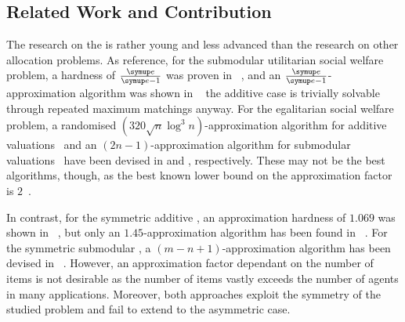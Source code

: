 \subsection{Related Work and Contribution}
\label{subsec:intro:contribution}

The research on the \NSW{} is rather young and less advanced than the research on other allocation problems.
As reference\footnotemark[1], for the submodular utilitarian social welfare problem, a hardness of \(\frac{\euler}{\euler - 1}\) was proven in \citeyear{inapprox_results_for_combi_auctions_with_submod_utility_funcs}~\cite{inapprox_results_for_combi_auctions_with_submod_utility_funcs}, and an \(\frac{\euler}{\euler - 1}\)-approximation algorithm was shown in \citeyear{opt_approx_for_the_submod_nsw_in_the_value_oracle_model}~\cite{opt_approx_for_the_submod_nsw_in_the_value_oracle_model} \Dash the additive case is trivially solvable through repeated maximum matchings anyway.
For the egalitarian social welfare problem, a randomised \((320 \sqrt{n} \log^3 n)\)-approximation algorithm for additive valuations~\cite{an_approx_algo_for_maxmin_fair_alloc_of_indiv_goods} and an \((2n-1)\)-approximation algorithm for submodular valuations~\cite{approx_algo_for_the_maxmin_alloc_problem} have been devised in \citeyear{an_approx_algo_for_maxmin_fair_alloc_of_indiv_goods} and \citeyear{approx_algo_for_the_maxmin_alloc_problem}, respectively.
These may not be the best algorithms, though, as the best known lower bound on the approximation factor is \(2\)~\cite{allocating_indiv_goods}.

In contrast, for the symmetric additive \NSW{}, an approximation hardness of \(1.069\) was shown in \citeyear{satiation_in_fisher_markets_and_approx_of_nsw}~\cite{satiation_in_fisher_markets_and_approx_of_nsw}, but only an \(1.45\)-approximation algorithm has been found in \citeyear{finding_fair_and_efficient_allocs}~\cite{finding_fair_and_efficient_allocs}.
For the symmetric submodular \NSW, a \((m - n + 1)\)-approximation algorithm has been devised in \citeyear{min_envy_and_max_avg_nsw_in_the_alloc_of_indiv_goods}~\cite{min_envy_and_max_avg_nsw_in_the_alloc_of_indiv_goods}.
However, an approximation factor dependant on the number of items is not desirable as the number of items vastly exceeds the number of agents in many applications.
Moreover, both approaches exploit the symmetry of the studied problem and fail to extend to the asymmetric case.


